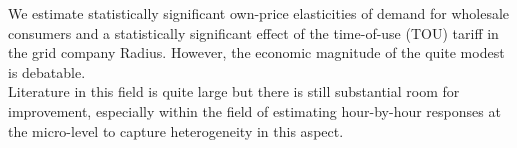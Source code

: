 \label{sec:conclusion}
We estimate statistically significant own-price elasticities of demand for wholesale consumers and a statistically significant effect of the time-of-use (TOU) tariff in the grid company Radius. However, the economic magnitude of the quite modest is debatable.
\medskip \\
Literature in this field is quite large but there is still substantial room for improvement, especially within the field of estimating hour-by-hour responses at the micro-level to capture heterogeneity in this aspect.
